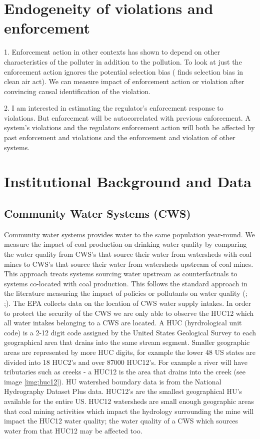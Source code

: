 \documentclass{article}
\begin{document}
\section{Endogeneity of violations and enforcement}

1. Enforcement action in other contexts has shown to depend on other characteristics of the polluter in addition to the pollution. To look at just the enforcement action ignores the potential selection bias (\cite{hanna2010impact} finds selection bias in clean air act). We can measure impact of enforcement action or violation after convincing causal identification of the violation.

2. I am interested in estimating the regulator's enforcement response to violations. But enforcement will be autocorrelated with previous enforcement. A system's violations and the regulators enforcement action will both be affected by past enforcement and violations and the enforcement and violation of other systems. 

\section{Institutional Background and Data}
\subsection{Community Water Systems (CWS)}

Community water systems provides water to the same population year-round. We measure the impact of coal production on drinking water quality by comparing the water quality from CWS's that source their water from watersheds with coal mines to CWS's that source their water from watersheds upstream of coal mines. This approach treats systems sourcing water upstream as counterfactuals to systems co-located with coal production. This follows the standard approach in the literature measuring the impact of policies or pollutants on water quality (\cite{keiser}; \cite{keiser};\cite{china cancer upstream}). The EPA collects data on the location of CWS water supply intakes. In order to protect the security of the CWS we are only able to observe the HUC12 which all water intakes belonging to a CWS are located. A HUC (hyrdrological unit code) is a 2-12 digit code assigned by the United States Geological Survey to each geographical area that drains into the same stream segment. Smaller geographic areas are represented by more HUC digits, for example the lower 48 US states are divided into 18 HUC2's and over 87000 HUC12's. For example a river will have tributaries such as creeks - a HUC12 is the area that drains into the creek (see image \ref{img:huc12}). HU watershed boundary data is from the National Hydrography Dataset Plus data. HUC12's are the smallest geographical HU's available for the entire US. HUC12 watersheds are small enough geographic areas that coal mining activities which impact the hydrology surrounding the mine will impact the HUC12 water quality; the water quality of a CWS which sources water from that HUC12 may be affected too. 
\end{document}
